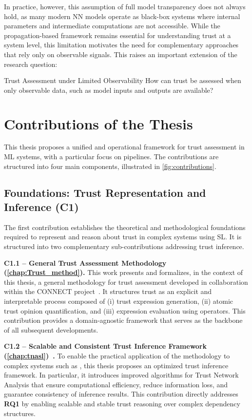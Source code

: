     
In practice, however, this assumption of full model transparency does not always hold, as many modern \ac{NN} models operate as black-box systems where internal parameters and intermediate computations are not accessible. While the propagation-based framework remains essential for understanding trust at a system level, this limitation motivates the need for complementary approaches that rely only on observable signals. This raises an important extension of the research question:
\begin{rqbox}{Trust Assessment under Limited Observability}
    How can trust be assessed when only observable data, such as model inputs and outputs are available?
\end{rqbox}



\section{Contributions of the Thesis}

This thesis proposes a unified and operational framework for trust assessment in \ac{ML} systems, with a particular focus on  pipelines. The contributions are structured into four main components,  illustrated in \cref{fig:contributions}.

\subsection{Foundations: Trust Representation and Inference (C1)}

The first contribution establishes the theoretical and methodological foundations required to represent and reason about trust in complex systems using \ac{SL}. It is structured into two complementary sub-contributions addressing trust inference.

\textbf{C1.1 -- General Trust Assessment Methodology (\cref{chap:Trust_method})\cite{5gaa_trust4cav_2025,connect_d31_taf}.}  This work presents and formalizes, in the context of this thesis, a general methodology for trust assessment developed in collaboration within the CONNECT project~\cite{connect_d31_taf}. It structures trust as an explicit and interpretable process composed of (i) trust expression generation, (ii) atomic trust opinion quantification, and (iii) expression evaluation using  operators. This contribution provides a domain-agnostic framework that serves as the backbone of all subsequent developments.

\textbf{C1.2 -- Scalable and Consistent Trust Inference Framework (\cref{chap:tnasl})~\cite{10.1007/978-3-032-08887-1_4}.}  
To enable the practical application of the methodology to complex systems such as , this thesis proposes an optimized trust inference framework. In particular, it introduces improved algorithms for Trust Network Analysis that ensure computational efficiency, reduce information loss, and guarantee consistency of inference results. This contribution directly addresses \textbf{\ac{RQ}1} by enabling scalable and stable trust reasoning over complex dependency structures.


